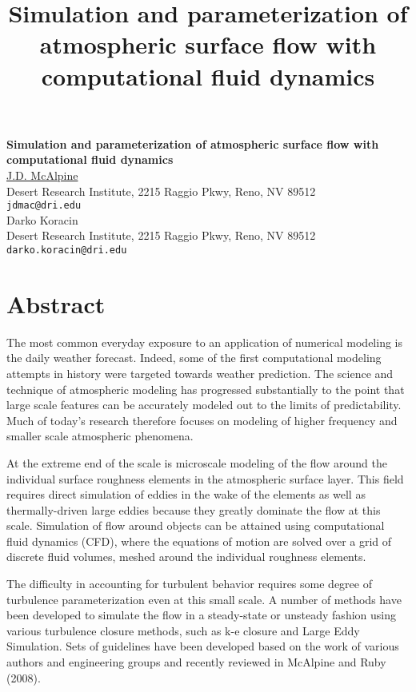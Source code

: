 \title{Simulation and parameterization of atmospheric surface flow with computational fluid dynamics}
\author{} \institute{}

\begin{center}

\textbf{\Large Simulation and parameterization of atmospheric surface flow with computational fluid dynamics}\\
\vspace{10mm}
{\large \underline{J.D. McAlpine}}\\
Desert Research Institute, 2215 Raggio Pkwy, Reno, NV 89512\\
{\tt jdmac@dri.edu}\\
\vspace{4mm}
{\large Darko Koracin}\\
Desert Research Institute, 2215 Raggio Pkwy, Reno, NV 89512\\
{\tt darko.koracin@dri.edu}

\end{center}

\section*{Abstract}

The most common everyday exposure to an application of numerical modeling is the daily weather forecast. Indeed, some of the first computational modeling attempts in history were targeted towards weather prediction. The science and technique of atmospheric modeling has progressed substantially to the point that large scale features can be accurately modeled out to the limits of predictability. Much of today\textquoteright s research therefore focuses on modeling of higher frequency and smaller scale atmospheric phenomena.

At the extreme end of the scale is microscale modeling of the flow around the individual surface roughness elements in the atmospheric surface layer. This field requires direct simulation of eddies in the wake of the elements as well as thermally-driven large eddies because they greatly dominate the flow at this scale. Simulation of flow around objects can be attained using computational fluid dynamics (CFD), where the equations of motion are solved over a grid of discrete  fluid volumes, meshed around the individual roughness elements.

The difficulty in accounting for turbulent behavior requires some degree of turbulence parameterization even at this small scale. A number of methods have been developed to simulate the flow in a steady-state or unsteady fashion using various turbulence closure methods, such as k-e closure and Large Eddy Simulation. Sets of guidelines have been developed based on the work of various authors and engineering groups and recently reviewed in McAlpine and Ruby (2008).

